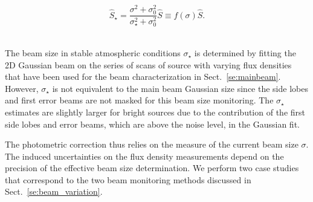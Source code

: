 \begin{equation}
\hat{S}_\star = \frac{\sigma^2 + \sigma_0^2}{\sigma_\star^2 + \sigma_0^2}\hat{S}
\equiv f(\sigma)\hat{S}.
\end{equation}

\\


The beam size in stable atmospheric conditions $\sigma_\star$ is
determined by fitting the 2D Gaussian beam on the series of scans of
source with varying flux densities that have been used for the beam
characterization in Sect.~\ref{se:mainbeam}. However, $\sigma_\star$
is not equivalent to the main beam Gaussian size since the side lobes
and first error beams are not masked for this beam size
monitoring. The $\sigma_\star$ estimates are slightly
larger for bright sources due to the contribution of the first side
lobes and error beams, which are above the noise level, in the Gaussian fit.


The photometric correction thus relies on the measure of the current beam size
$\sigma$. The induced uncertainties on the flux density measurements depend on
the precision of the effective beam size determination. We perform two case
studies that correspond to the two beam monitoring methods discussed in
Sect.~\ref{se:beam_variation}.\\

